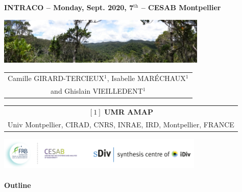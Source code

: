 {

  \begin{frame}
    \begin{center}
        \small{\textbf{INTRACO -- Monday, Sept. 2020, 7$^{\text{th}}$ -- CESAB Montpellier}}
    \end{center}
    \vspace{-0.25cm}
    \titlepage %
    \vspace{-2.5cm}
    \begin{center}
      \includegraphics[width=10cm]{figs/Banniere.png}
    \end{center}
    \vspace{0.25cm}
    \begin{center}

        \begin{tabular}{c}
          Camille \uppercase{Girard-Tercieux}$^{1}$, Isabelle \uppercase{Maréchaux}$^{1}$ \\ and Ghislain \uppercase{Vieilledent}$^{1}$
        \end{tabular}

      \vspace{0.25cm}

      {\small
        \begin{tabular}{c}
          $[1]$ \textbf{UMR AMAP} \\ Univ Montpellier, CIRAD, CNRS, INRAE, IRD, Montpellier, FRANCE
        \end{tabular}
      }

      \vspace{0.25cm}
      \includegraphics[height=1.5cm]{figs/logos-FRB-Cesab-iDiv-sDiv}

    \end{center}
    
  \end{frame}
}
\setcounter{framenumber}{0}


\placelogotrue
\begin{frame}
  \framesubtitle{Outline}
  \begin{columns}[c]
    \begin{column}{0.5\textwidth}
      \tableofcontents[sections=1]
      \vspace{1cm}
      \tableofcontents[sections=2]
    \end{column}
    \begin{column}{0.5\textwidth}
      \tableofcontents[sections={3-4}]
    \end{column}
  \end{columns}
\end{frame}
\placelogofalse